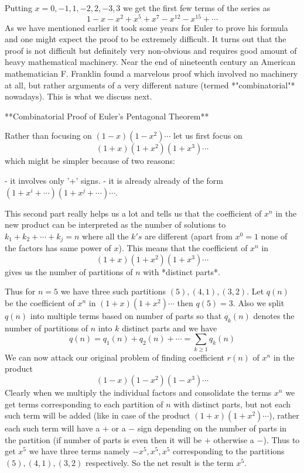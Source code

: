 Putting $x = 0, -1, 1, -2, 2, -3, 3$ we get the first few terms of the series as $$1 - x - x^{2} + x^{5} + x^{7} - x^{12} - x^{15} + \cdots$$ As we have mentioned earlier it took some years for Euler to prove his formula and one might expect the proof to be extremely difficult. It turns out that the proof is not difficult but definitely very non-obvious and requires good amount of heavy mathematical machinery. Near the end of nineteenth century an American mathematician F. Franklin found a marvelous proof which involved no machinery at all, but rather arguments of a very different nature (termed *"combinatorial"* nowadays). This is what we discuss next.

**Combinatorial Proof of Euler's Pentagonal Theorem**

Rather than focusing on $(1 - x)(1 - x^{2})\cdots$ let us first focus on $$(1 + x)(1 + x^{2})(1 + x^{3})\cdots$$ which might be simpler because of two reasons:

 - it involves only '+' signs.
 - it is already already of the form $(1 + x^{i} + \cdots)(1 + x^{j} + \cdots)\cdots$.

This second part really helps us a lot and tells us that the coefficient of $x^{n}$ in the new product can be interpreted as the number of solutions to $k_{1} + k_{2} + \cdots + k_{j} = n$ where all the $k's$ are different (apart from $x^{0} = 1$ none of the factors has same power of $x$). This means that the coefficient of $x^{n}$ in $$(1 + x)(1 + x^{2})(1 + x^{3})\cdots$$ gives us the number of partitions of $n$ with *distinct parts*.

Thus for $n = 5$ we have three such partitions $(5), (4, 1), (3, 2)$. Let $q(n)$ be the coefficient of $x^{n}$ in $(1 + x)(1 + x^{2})\cdots$ then $q(5) = 3$. Also we split $q(n)$ into multiple terms based on number of parts so that $q_{k}(n)$ denotes the number of partitions of $n$ into $k$ distinct parts and we have $$q(n) = q_{1}(n) + q_{2}(n) + \cdots = \sum_{k \geq 1}q_{k}(n)$$ We can now attack our original problem of finding coefficient $r(n)$ of $x^{n}$ in the product $$(1 - x)(1 - x^{2})(1 - x^{3})\cdots$$ Clearly when we multiply the individual factors and consolidate the terms $x^{n}$ we get terms corresponding to each partition of $n$ with distinct parts, but not each such term will be added (like in case of the product $(1 + x)(1 + x^{2})\cdots$), rather each such term will have a $+$ or a $-$ sign depending on the number of parts in the partition (if number of parts is even then it will be $+$ otherwise a $-$). Thus to get $x^{5}$ we have three terms namely $-x^{5}, x^{5}, x^{5}$ corresponding to the partitions $(5), (4, 1), (3, 2)$ respectively. So the net result is the term $x^{5}$.

